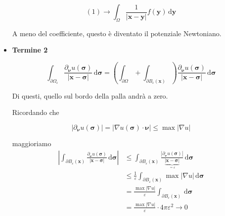 \documentclass[10pt,a4paper,twoside,openright]{book}
\newcommand{\x}{\mathbf{x}}
\newcommand{\y}{\mathbf{y}}
\newcommand{\sigg}{\bm{\sigma}}
\newcommand{\nuu}{\bm{\nu}}
\newcommand{\de}{\,\mathrm d}
\newcommand{\dyy}{\de \y}
\newcommand{\dsig}{\de \sigg}
\begin{document}
\begin{dimostrazione}
\begin{itemize}
              \begin{equation*}
                  (1)\rightarrow \int _{\Omega }\frac{1}{| \x -\y| } f(\y) \dyy
              \end{equation*}

              A meno del coefficiente, questo è diventato il potenziale Newtoniano.
        \item \textbf{Termine 2}

              \begin{equation*}
                  \int _{\partial \Omega _{\varepsilon }}\frac{\partial _{\nuu} u(\sigg)}{| \x -\sigg| } \dsig =\left(\int _{\partial \Omega } +\int _{\partial B_{\varepsilon }(\x)}\right)\frac{\partial _{\nuu} u(\sigg)}{| \x -\sigg| } \dsig
              \end{equation*}

              Di questi, quello sul bordo della palla andrà a zero.

              Ricordando che

              \begin{equation*}
                  | \partial _{\nuu} u(\sigg)| =| \nabla u(\sigg) \cdotp \nuu| \leqslant \max| \nabla u|
              \end{equation*}

              maggioriamo
              \begin{align*}
                  \left| \int _{\partial B_{\varepsilon }(\x)}\frac{\partial _{\nuu} u(\sigg)}{| \x -\sigg| } \dsig\right| & \leqslant \int _{\partial B_{\varepsilon }(\x)}\frac{| \partial _{\nuu} u(\sigg)| }{\underbrace{| \x -\sigg| }_{=\varepsilon }} \dsig \\
                                                                                                                           & \leqslant \frac{1}{\varepsilon }\int _{\partial B_{\varepsilon }(\x)}\max| \nabla u| \dsig                                            \\
                                                                                                                           & =\frac{\max| \nabla u| }{\varepsilon }\int _{\partial B_{\varepsilon }(\x)} \dsig                                                     \\
                                                                                                                           & =\frac{\max| \nabla u| }{\varepsilon } \cdotp 4\pi \varepsilon ^{2}\rightarrow 0
              \end{align*}


\end{itemize}
\end{dimostrazione}
\end{document}
